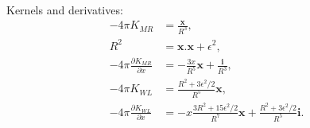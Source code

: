 \documentclass[a4paper,12pt]{article}
\begin{document}
Kernels and derivatives:
\begin{align*}
  -4\pi K_{MR}
  &=
  \frac{\mathbf{x}}{R^{3}},\\
  R^{2} &= \mathbf{x}.\mathbf{x}+\epsilon^{2},\\
  -4\pi \frac{\partial K_{MR}}{\partial x}
  &=
  -\frac{3x}{R^{5}}\mathbf{x} + \frac{\mathbf{i}}{R^{3}},\\
  -4\pi K_{WL}
  &=
  \frac{R^{2}+3\epsilon^{2}/2}{R^{5}}\mathbf{x},\\
  -4\pi \frac{\partial K_{WL}}{\partial x}
  &=
  -x\frac{3R^{2}+15\epsilon^{2}/2}{R^{7}}\mathbf{x}
  +
  \frac{R^{2}+3\epsilon^{2}/2}{R^{5}}\mathbf{i}.
\end{align*}
\end{document}
